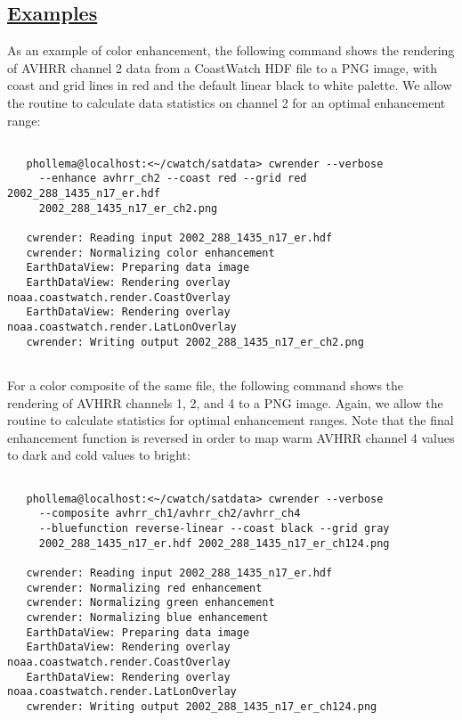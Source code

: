 \subsection*{\underline{Examples}}


 As an example of color enhancement, the following command shows the rendering of AVHRR channel 2 data from a CoastWatch HDF file to a PNG image, with coast and grid lines in red and the default linear black to white palette. We allow the routine to calculate data statistics on channel 2 for an optimal enhancement range: \begin{verbatim}

   phollema@localhost:<~/cwatch/satdata> cwrender --verbose 
     --enhance avhrr_ch2 --coast red --grid red 2002_288_1435_n17_er.hdf 
     2002_288_1435_n17_er_ch2.png

   cwrender: Reading input 2002_288_1435_n17_er.hdf
   cwrender: Normalizing color enhancement
   EarthDataView: Preparing data image
   EarthDataView: Rendering overlay noaa.coastwatch.render.CoastOverlay
   EarthDataView: Rendering overlay noaa.coastwatch.render.LatLonOverlay
   cwrender: Writing output 2002_288_1435_n17_er_ch2.png
 
\end{verbatim}
 For a color composite of the same file, the following command shows the rendering of AVHRR channels 1, 2, and 4 to a PNG image. Again, we allow the routine to calculate statistics for optimal enhancement ranges. Note that the final enhancement function is reversed in order to map warm AVHRR channel 4 values to dark and cold values to bright: \begin{verbatim}

   phollema@localhost:<~/cwatch/satdata> cwrender --verbose 
     --composite avhrr_ch1/avhrr_ch2/avhrr_ch4 
     --bluefunction reverse-linear --coast black --grid gray 
     2002_288_1435_n17_er.hdf 2002_288_1435_n17_er_ch124.png

   cwrender: Reading input 2002_288_1435_n17_er.hdf
   cwrender: Normalizing red enhancement
   cwrender: Normalizing green enhancement
   cwrender: Normalizing blue enhancement
   EarthDataView: Preparing data image
   EarthDataView: Rendering overlay noaa.coastwatch.render.CoastOverlay
   EarthDataView: Rendering overlay noaa.coastwatch.render.LatLonOverlay
   cwrender: Writing output 2002_288_1435_n17_er_ch124.png
 
\end{verbatim}
